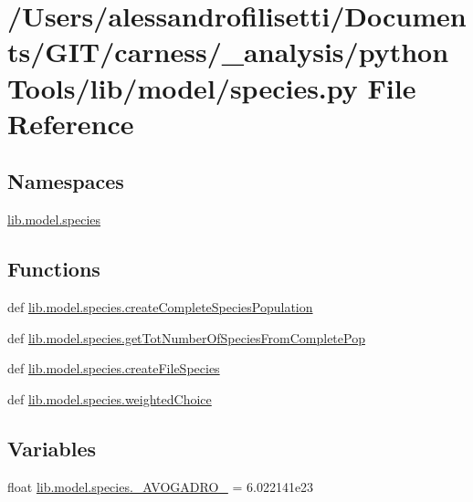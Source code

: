 \hypertarget{a00096}{\section{/\+Users/alessandrofilisetti/\+Documents/\+G\+I\+T/carness/\+\_\+analysis/python\+Tools/lib/model/species.py File Reference}
\label{a00096}
}
\subsection*{Namespaces}
\begin{DoxyCompactItemize}
\item 
 \hyperlink{a00150}{lib.\+model.\+species}
\end{DoxyCompactItemize}
\subsection*{Functions}
\begin{DoxyCompactItemize}
\item 
def \hyperlink{a00150_aaa0ed83b7623b65c77b0d583590219ec}{lib.\+model.\+species.\+create\+Complete\+Species\+Population}
\item 
def \hyperlink{a00150_a1c482d162198854303fbcd154fb1ccbf}{lib.\+model.\+species.\+get\+Tot\+Number\+Of\+Species\+From\+Complete\+Pop}
\item 
def \hyperlink{a00150_a0aab4ec6c7d010b885204f0420072f29}{lib.\+model.\+species.\+create\+File\+Species}
\item 
def \hyperlink{a00150_a13eb7af04a51ec15dd79ef70fadc93f4}{lib.\+model.\+species.\+weighted\+Choice}
\end{DoxyCompactItemize}
\subsection*{Variables}
\begin{DoxyCompactItemize}
\item 
float \hyperlink{a00150_a4a6d118da79b62429ea35b64ef429b11}{lib.\+model.\+species.\+\_\+\+A\+V\+O\+G\+A\+D\+R\+O\+\_\+} = 6.\+022141e23
\end{DoxyCompactItemize}
